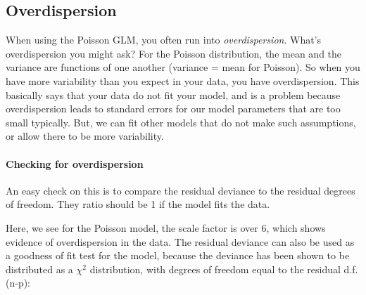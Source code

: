 \documentclass[
]{article}
\newenvironment{Shaded}{\begin{snugshade}}{\end{snugshade}}
\newcommand{\AttributeTok}[1]{\textcolor[rgb]{0.77,0.63,0.00}{#1}}
\newcommand{\DecValTok}[1]{\textcolor[rgb]{0.00,0.00,0.81}{#1}}
\newcommand{\FunctionTok}[1]{\textcolor[rgb]{0.00,0.00,0.00}{#1}}
\newcommand{\NormalTok}[1]{#1}
\newcommand{\OtherTok}[1]{\textcolor[rgb]{0.56,0.35,0.01}{#1}}
\newcommand{\SpecialCharTok}[1]{\textcolor[rgb]{0.00,0.00,0.00}{#1}}
\begin{document}
\hypertarget{overdispersion}{%
\subsection{Overdispersion}\label{overdispersion}}

When using the Poisson GLM, you often run into \emph{overdispersion}. What's overdispersion you might ask? For the Poisson distribution, the mean and the variance are functions of one another (variance = mean for Poisson). So when you have more variability than you expect in your data, you have overdispersion. This basically says that your data do not fit your model, and is a problem because overdispersion leads to standard errors for our model parameters that are too small typically. But, we can fit other models that do not make such assumptions, or allow there to be more variability.

\hypertarget{checking-for-overdispersion}{%
\paragraph{Checking for overdispersion}\label{checking-for-overdispersion}}

An easy check on this is to compare the residual deviance to the residual degrees of freedom. They ratio should be 1 if the model fits the data.

\begin{Shaded}
\end{Shaded}

Here, we see for the Poisson model, the scale factor is over 6, which shows evidence of overdispersion in the data. The residual deviance can also be used as a goodness of fit test for the model, because the deviance has been shown to be distributed as a \(\chi^2\) distribution, with degrees of freedom equal to the residual d.f. (n-p):

\begin{Shaded}
\end{Shaded}
\end{document}
